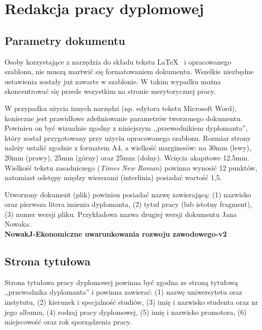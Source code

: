 \chapter{Redakcja pracy dyplomowej}
\label{chap:trzeci}



\section{Parametry dokumentu}
Osoby korzystające z narzędzia do składu tekstu \LaTeX~ i opracowanego szablonu, nie muszą martwić się formatowaniem dokumentu. Wszelkie niezbędne ustawienia zostały już zawarte w szablonie. W takim wypadku można skoncentrować się przede wszystkim na stronie merytorycznej pracy.

W przypadku użycia innych narzędzi (np. edytora tekstu Microsoft Word), konieczne jest prawidłowe zdefiniowanie parametrów tworzonego dokumentu. Powinien on być wizualnie zgodny z niniejszym ,,przewodnikiem dyplomanta'', który został przygotowany przy użyciu opracowanego szablonu. Rozmiar strony należy ustalić zgodnie z formatem A4, a wielkość marginesów: na 30mm (lewy), 20mm (prawy), 25mm (górny) oraz 25mm (dolny). Wcięcia akapitowe 12.5mm. Wielkość tekstu zasadniczego (\textit {Times New Roman}) powinna wynosić 12 punktów, natomiast odstępy między wierszami (interlinia) posiadać wartość 1,5.

Utworzony dokument (plik) powinien posiadać nazwę zawierającą: (1) nazwisko oraz pierwsza litera imienia dyplomanta, (2) tytuł pracy (lub istotny fragment), (3) numer wersji pliku. Przykładowa nazwa drugiej wersji dokumentu Jana Nowaka:\\

\textbf{NowakJ-Ekonomiczne uwarunkowania rozwoju zawodowego-v2
}

\section{Strona tytułowa}
Strona tytułowa pracy dyplomowej powinna być zgodna ze stroną tytułową ,,przewodnika dyplomanta'' i powinna zawierać: (1) nazwę uniwersytetu oraz instytutu, (2) kierunek i specjalność studiów, (3) imię i nazwisko studenta oraz nr jego albumu, (4) rodzaj pracy dyplomowej, (5) imię i nazwisko promotora, (6) miejscowość oraz rok sporządzenia pracy.


